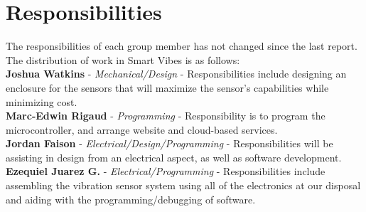 \documentclass[12pt]{article}
\begin{document}
\section{Responsibilities}
The responsibilities of each group member has not changed since the last report. The distribution of work in Smart Vibes is as follows:\\

\noindent \textbf{Joshua Watkins} - \textit{Mechanical/Design} - Responsibilities include designing an enclosure for the sensors that will maximize the sensor's capabilities while minimizing cost.\\

\noindent \textbf{Marc-Edwin Rigaud} - \textit{Programming} - Responsibility is to program the microcontroller, and arrange website and cloud-based services.\\

\noindent \textbf{Jordan Faison} - \textit{Electrical/Design/Programming} - Responsibilities will be assisting in design from an electrical aspect, as well as software development.\\

\noindent \textbf{Ezequiel Juarez G.} - \textit{Electrical/Programming} - Responsibilities include assembling the vibration sensor system using all of the electronics at our disposal and aiding with the programming/debugging of software.
\end{document}
